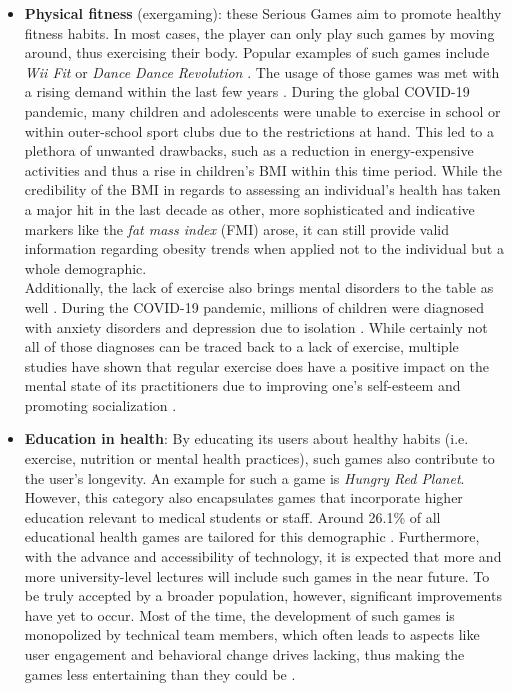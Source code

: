 \documentclass[draft,final]{vutinfth} %
\begin{document}
\begin{itemize}
\item \textbf{Physical fitness} (exergaming): these Serious Games aim to promote healthy fitness habits. In most cases, the player can only play such games by moving around, thus exercising their body.%
Popular examples of such games include \emph{Wii Fit} \cite{nitz2010wii} or \emph{Dance Dance Revolution} \cite{trout2005using}. The usage of those games was met with a rising demand within the last few years \cite{santos2021active}. During the global COVID-19 pandemic, many children and adolescents were unable to exercise in school or within outer-school sport clubs due to the restrictions at hand. This led to a plethora of unwanted drawbacks, such as a reduction in energy-expensive activities and thus a rise in children's BMI within this time period. While the credibility of the BMI in regards to assessing an individual's health has taken a major hit in the last decade \cite{alpizar2020fat} as other, more sophisticated and indicative markers like the \emph{fat mass index} (FMI) arose, it can still provide valid information regarding obesity trends when applied not to the individual but a whole demographic. \\
Additionally, the lack of exercise also brings mental disorders to the table as well \cite{santos2021active}. During the COVID-19 pandemic, millions of children were diagnosed with anxiety disorders and depression due to isolation \cite{santos2021active}. While certainly not all of those diagnoses can be traced back to a lack of exercise, multiple studies have shown that regular exercise does have a positive impact on the mental state of its practitioners due to improving one's self-esteem and promoting socialization \cite{santos2021active,comeras2021effects}. 

\item \textbf{Education in health}: By educating its users about healthy habits (i.e. exercise, nutrition or mental health practices), such games also contribute to the user's longevity. An example for such a game is \emph{Hungry Red Planet}\cite{anderson2002hungry}. However, this category also encapsulates games that incorporate higher education relevant to medical students or staff. Around 26.1\% of all educational health games are tailored for this demographic \cite{sharifzadeh2020health}. Furthermore, with the advance and accessibility of technology, it is expected that more and more university-level lectures will include such games in the near future. To be truly accepted by a broader population, however, significant improvements have yet to occur. Most of the time, the development of such games is monopolized by technical team members, which often leads to aspects like user engagement and behavioral change drives lacking, thus making the games less entertaining than they could be \cite{sharifzadeh2020health}.


\end{itemize}
\end{document}
